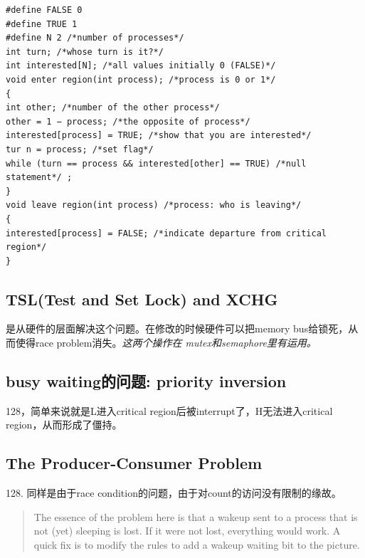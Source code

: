\documentclass[a4paper]{article}
\begin{document}
\begin{centering}
\begin{verbatim}
#define FALSE 0
#define TRUE 1
#define N 2 /*number of processes*/
int turn; /*whose turn is it?*/
int interested[N]; /*all values initially 0 (FALSE)*/
void enter region(int process); /*process is 0 or 1*/
{
int other; /*number of the other process*/
other = 1 − process; /*the opposite of process*/
interested[process] = TRUE; /*show that you are interested*/
tur n = process; /*set flag*/
while (turn == process && interested[other] == TRUE) /*null statement*/ ;
}
void leave region(int process) /*process: who is leaving*/
{
interested[process] = FALSE; /*indicate departure from critical
region*/
}
\end{verbatim}
\end{centering} 

\subsection{TSL(Test and Set Lock) and XCHG}
是从硬件的层面解决这个问题。在修改的时候硬件可以把memory bus给锁死，从而使得race problem消失。\textit{这两个操作在
mutex和semaphore里有运用。}

\subsection{busy waiting的问题: priority inversion}
128，简单来说就是L进入critical region后被interrupt了，H无法进入critical region，从而形成了僵持。

\subsection{The Producer-Consumer Problem}
128. 同样是由于race condition的问题，由于对count的访问没有限制的缘故。

\begin{quote}
The essence of the problem here is that a wakeup sent to a process that is not (yet) sleeping is lost. If it were not lost, everything would work. A quick fix is to modify the rules to add a wakeup waiting bit to the picture.
\end{quote}
\end{document}
